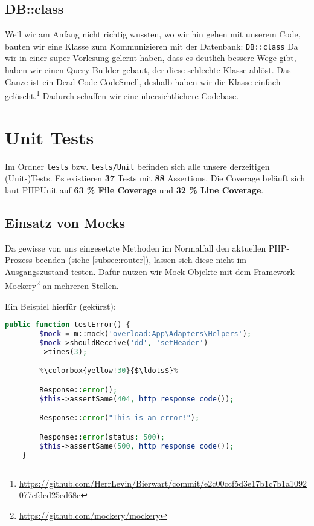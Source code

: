 \documentclass[12pt,a4paper,titlepage,ngerman,pdftex]{report}
\begin{document}
    \subsection{DB::class}\label{subsec:db::class}
    Weil wir am Anfang nicht richtig wussten, wo wir hin gehen mit unserem Code, bauten wir eine Klasse zum Kommunizieren mit der Datenbank: \verb|DB::class|
    Da wir in einer super Vorlesung gelernt haben, dass es deutlich bessere Wege gibt, haben wir einen Query-Builder gebaut, der diese schlechte Klasse ablöst.
    Das Ganze ist ein \href{https://refactoring.guru/smells/dead-code}{Dead Code} CodeSmell, deshalb haben wir die Klasse einfach gelöscht.\footnote{\url{https://github.com/HerrLevin/Bierwart/commit/e2c00ccf5d3e17b1c7b1a1092077cfdcd25ed68c}}
    Dadurch schaffen wir eine übersichtlichere Codebase.

    \section{Unit Tests}
    Im Ordner \verb|tests| bzw. \verb|tests/Unit| befinden sich alle unsere derzeitigen (Unit-)Tests.
    Es existieren \textbf{37} Tests mit \textbf{88} Assertions.
    Die Coverage beläuft sich laut PHPUnit auf \textbf{63 \% File Coverage} und \textbf{32 \% Line Coverage}.

    \subsection{Einsatz von Mocks}
    Da gewisse von uns eingesetzte Methoden im Normalfall den aktuellen PHP-Prozess beenden (siehe \ref{subsec:router}), lassen sich diese nicht im Ausgangszustand testen.
    Dafür nutzen wir Mock-Objekte mit dem Framework Mockery\footnote{\url{https://github.com/mockery/mockery}} an mehreren Stellen.

    Ein Beispiel hierfür (gekürzt):
    \begin{lstlisting}[language=php,label={lst:mockery},escapechar=\%]
    public function testError() {
        $mock = m::mock('overload:App\Adapters\Helpers');
        $mock->shouldReceive('dd', 'setHeader')
        ->times(3);

        %\colorbox{yellow!30}{$\ldots$}%

        Response::error();
        $this->assertSame(404, http_response_code());

        Response::error("This is an error!");

        Response::error(status: 500);
        $this->assertSame(500, http_response_code());
    }
    \end{lstlisting}
\end{document}
